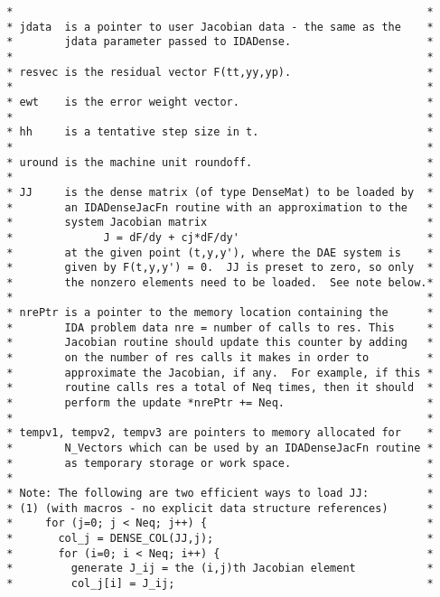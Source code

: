 \begin{verbatim}
 *                                                                *
 * jdata  is a pointer to user Jacobian data - the same as the    *
 *        jdata parameter passed to IDADense.                     *
 *                                                                *
 * resvec is the residual vector F(tt,yy,yp).                     *
 *                                                                *
 * ewt    is the error weight vector.                             *
 *                                                                *
 * hh     is a tentative step size in t.                          *
 *                                                                *
 * uround is the machine unit roundoff.                           *
 *                                                                *
 * JJ     is the dense matrix (of type DenseMat) to be loaded by  *
 *        an IDADenseJacFn routine with an approximation to the   *
 *        system Jacobian matrix                                  *
 *              J = dF/dy + cj*dF/dy'                             *
 *        at the given point (t,y,y'), where the DAE system is    *
 *        given by F(t,y,y') = 0.  JJ is preset to zero, so only  *
 *        the nonzero elements need to be loaded.  See note below.*
 *                                                                *
 * nrePtr is a pointer to the memory location containing the      *
 *        IDA problem data nre = number of calls to res. This     *
 *        Jacobian routine should update this counter by adding   *
 *        on the number of res calls it makes in order to         *
 *        approximate the Jacobian, if any.  For example, if this *
 *        routine calls res a total of Neq times, then it should  *
 *        perform the update *nrePtr += Neq.                      *
 *                                                                *
 * tempv1, tempv2, tempv3 are pointers to memory allocated for    *
 *        N_Vectors which can be used by an IDADenseJacFn routine *
 *        as temporary storage or work space.                     *
 *                                                                *
 * Note: The following are two efficient ways to load JJ:         *
 * (1) (with macros - no explicit data structure references)      *
 *     for (j=0; j < Neq; j++) {                                  *
 *       col_j = DENSE_COL(JJ,j);                                 *
 *       for (i=0; i < Neq; i++) {                                *
 *         generate J_ij = the (i,j)th Jacobian element           *
 *         col_j[i] = J_ij;                                       *

\end{verbatim}
